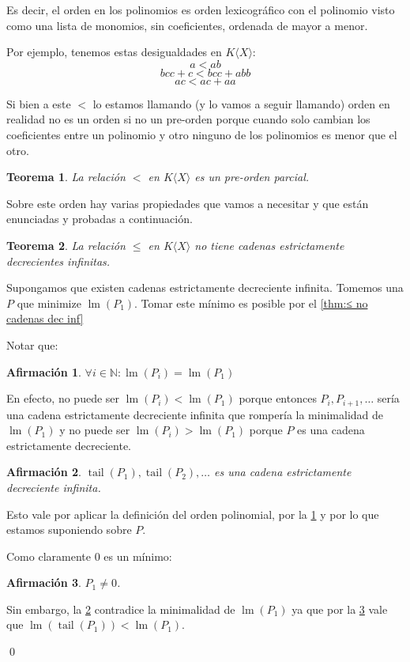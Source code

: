 \documentclass{report}
\theoremstyle{customstyle}
\newtheorem{theorem}{Teorema}[chapter]
\renewenvironment{proof}[1][\proofname]{{\bfseries #1: }}{\qed} %
\theoremstyle{factstyle}
\newtheorem{fact}{Afirmación}[theorem]
\DeclareMathOperator{\lm}{lm}
\DeclareMathOperator{\tail}{tail}
\begin{document}
Es decir, el orden en los polinomios es orden lexicográfico con el polinomio visto como una lista de monomios, sin coeficientes, ordenada de mayor a menor.

Por ejemplo, tenemos estas desigualdades en $K⟨X⟩$:
\[ a < ab \]
\[ bcc + c < bcc + abb \]
\[ ac < ac + aa \]

Si bien a este $<$ lo estamos llamando (y lo vamos a seguir llamando) orden en realidad no es un orden si no un pre-orden porque cuando solo cambian los coeficientes entre un polinomio y otro ninguno de los polinomios es menor que el otro.

\begin{theorem}
  La relación $<$ en $K⟨X⟩$ es un pre-orden parcial.
\end{theorem}

Sobre este orden hay varias propiedades que vamos a necesitar y que están enunciadas y probadas a continuación.

\begin{theorem}\label{thm:≤ en KX no cadenas dec inf}
  La relación $≤$ en $K⟨X⟩$ no tiene cadenas estrictamente decrecientes infinitas.
\end{theorem}
\begin{proof}
  Supongamos que existen cadenas estrictamente decreciente infinita. Tomemos una $P$ que minimize $\lm(P_1)$. Tomar este mínimo es posible por el \cref{thm:≤ no cadenas dec inf}

  Notar que:

  \begin{fact}\label{fact:≤ en KX no cadenas dec inf:1}
    $∀i ∈ ℕ : \lm(P_i) = \lm(P_1)$
  \end{fact}
  En efecto, no puede ser $\lm(P_i) < \lm(P_1)$ porque entonces $P_i, P_{i + 1}, …$ sería una cadena estrictamente decreciente infinita que rompería la minimalidad de $\lm(P_1)$ y no puede ser $\lm(P_i) > \lm(P_1)$ porque $P$ es una cadena estrictamente decreciente.

  \begin{fact}\label{fact:≤ en KX no cadenas dec inf:2}
    $\tail(P_1), \tail(P_2), …$ es una cadena estrictamente decreciente infinita.
  \end{fact}
  Esto vale por aplicar la definición del orden polinomial, por la \cref{fact:≤ en KX no cadenas dec inf:1} y por lo que estamos suponiendo sobre $P$.

  Como claramente $0$ es un mínimo:

  \begin{fact}\label{fact:≤ en KX no cadenas dec inf:3}
    $P_1 ≠ 0$.
  \end{fact}

  Sin embargo, la \cref{fact:≤ en KX no cadenas dec inf:2} contradice la minimalidad de $\lm(P_1)$ ya que por la \cref{fact:≤ en KX no cadenas dec inf:3} vale que $\lm(\tail(P_1)) < \lm(P_1)$.

\end{proof}
\end{document}
